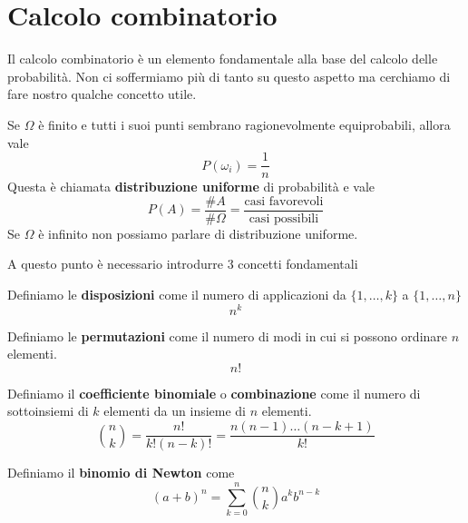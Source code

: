 \chapter{Calcolo combinatorio}
Il calcolo combinatorio è un elemento fondamentale alla base del calcolo delle probabilità. Non ci
soffermiamo più di tanto su questo aspetto ma cerchiamo di fare nostro qualche concetto utile.

Se $\Omega$ è finito e tutti i suoi punti sembrano ragionevolmente equiprobabili, allora vale
\[ P(\omega_i) = \frac{1}{n} \]
Questa è chiamata \textbf{distribuzione uniforme} di probabilità e vale
\[ P(A) = \frac{\# A}{\# \Omega} = \frac{\text{casi favorevoli}}{\text{casi possibili}} \]
Se $\Omega$ è infinito non possiamo parlare di distribuzione uniforme.

A questo punto è necessario introdurre 3 concetti fondamentali
\begin{definition}
	Definiamo le \textbf{disposizioni} come il numero di applicazioni da $\{ 1, \dots, k \}$ a
	$\{ 1, \dots, n \}$
	\[ n^k \]
\end{definition}

\begin{definition}
	Definiamo le \textbf{permutazioni} come il numero di modi in cui si possono ordinare $n$ elementi.
	\[ n! \]
\end{definition}

\begin{definition}
	Definiamo il \textbf{coefficiente binomiale} o \textbf{combinazione} come il numero di sottoinsiemi
	di $k$ elementi da un insieme di $n$ elementi.
	\[ \binom{n}{k} = \frac{n!}{k! (n-k)!} = \frac{n (n-1) \dots (n-k+1)}{k!} \]
\end{definition}

\begin{definition}
	Definiamo il \textbf{binomio di Newton} come
	\[ (a + b)^n = \sum_{k=0}^n \binom{n}{k} a^k b^{n-k} \]
\end{definition}
